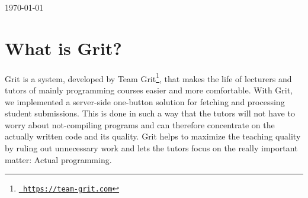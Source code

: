 \documentclass[10pt,a4paper, titlepage, toc=idx]{scrreprt}
\theoremstyle{definition}
\theoremstyle{plain}
\newcommand*{\product}{Grit}
\begin{document}
\begin{titlepage}
\begin{center}
			
    \vfill
			
    {\large \today}
			
  \end{center}
\end{titlepage}
\setcounter{tocdepth}{1}
	
\setcounter{page}{2} \cleardoublepage
\tableofcontents
\chapter{What is \product?}
\product{} is a system, developed by {\sc Team
  Grit}\footnote{\href{https://team-grit.com}{{\tt
      https://team-grit.com}}}, that makes the life of lecturers and
tutors of mainly programming courses easier and more comfortable. With
\product, we implemented a server-side one-button solution for
fetching and processing student submissions. This is done in such a
way that the tutors will not have to worry about not-compiling
programs and can therefore concentrate on the actually written code
and its quality. \product{} helps to maximize the teaching quality by
ruling out unnecessary work and lets the tutors focus on the really
important matter: Actual programming.
\end{document}
